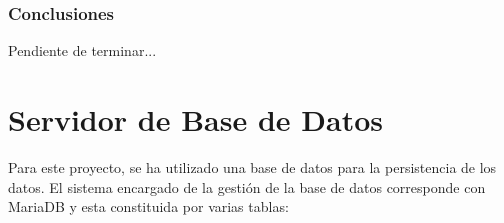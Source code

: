\subsubsection{Conclusiones}
\label{sssec:conclusionPruebas}

Pendiente de terminar...

\section{Servidor de Base de Datos}

Para este proyecto, se ha utilizado una base de datos para la persistencia de los datos. El sistema encargado de la gestión de la base de datos corresponde con MariaDB y esta constituida por varias tablas:
